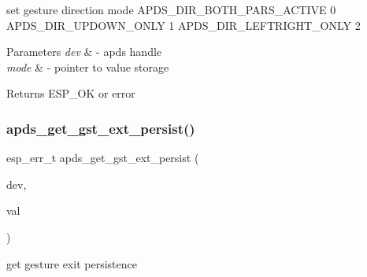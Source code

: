 \begin{DoxyItemize}
\item set gesture direction mode A\+P\+D\+S\+\_\+\+D\+I\+R\+\_\+\+B\+O\+T\+H\+\_\+\+P\+A\+R\+S\+\_\+\+A\+C\+T\+I\+VE 0 A\+P\+D\+S\+\_\+\+D\+I\+R\+\_\+\+U\+P\+D\+O\+W\+N\+\_\+\+O\+N\+LY 1 A\+P\+D\+S\+\_\+\+D\+I\+R\+\_\+\+L\+E\+F\+T\+R\+I\+G\+H\+T\+\_\+\+O\+N\+LY 2 
\end{DoxyItemize}


\begin{DoxyParams}{Parameters}
{\em dev} & -\/ apds handle \\
\hline
{\em mode} & -\/ pointer to value storage \\
\hline
\end{DoxyParams}
\begin{DoxyReturn}{Returns}
E\+S\+P\+\_\+\+OK or error 
\end{DoxyReturn}
\mbox{\label{group__APDS9960__GestureFunctions_gab18d83431aa818c8afdac98abbbd4bcd}} 
\subsubsection{\texorpdfstring{apds\+\_\+get\+\_\+gst\+\_\+ext\+\_\+persist()}{apds\_get\_gst\_ext\_persist()}}
{\footnotesize\ttfamily esp\+\_\+err\+\_\+t apds\+\_\+get\+\_\+gst\+\_\+ext\+\_\+persist (\begin{DoxyParamCaption}\item[{\hyperlink{structAPDS9960__Driver}{A\+P\+D\+S\+\_\+\+D\+EV}}]{dev,  }\item[{\hyperlink{vl53l0x__types_8h_aba7bc1797add20fe3efdf37ced1182c5}{uint8\+\_\+t} $\ast$}]{val }\end{DoxyParamCaption})}




\begin{DoxyItemize}
\item get gesture exit persistence 
\end{DoxyItemize}



